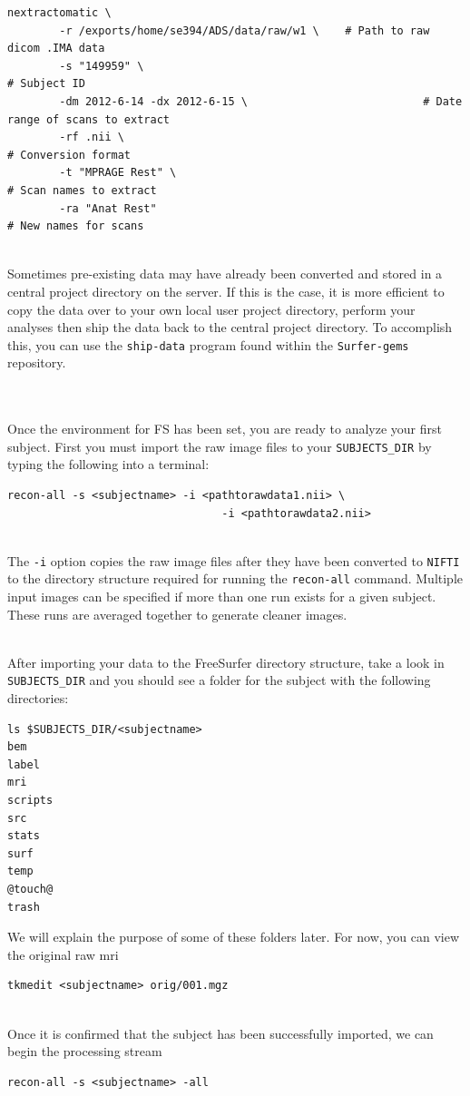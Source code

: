 \documentclass[paper=a4, fontsize=11pt]{scrartcl} %
\numberwithin{equation}{section} %
\numberwithin{figure}{section} %
\numberwithin{table}{section} %
\begin{document}
\begin{lstlisting}
nextractomatic \
		-r /exports/home/se394/ADS/data/raw/w1 \	# Path to raw dicom .IMA data
		-s "149959" \															# Subject ID
		-dm 2012-6-14 -dx 2012-6-15 \							# Date range of scans to extract
		-rf .nii \																# Conversion format
		-t "MPRAGE Rest" \ 												# Scan names to extract
		-ra "Anat Rest"													# New names for scans
\end{lstlisting}

~\\Sometimes pre-existing data may have already been converted and stored in a central project directory on the server.  If this is the case, it is more efficient to copy the data over to your own local user project directory, perform your analyses then ship the data back to the central project directory.  To accomplish this, you can use the \texttt{ship-data} program found within the \texttt{Surfer-gems} repository.

~\\ \\ Once the environment for FS has been set, you are ready to analyze your first subject.  First you must import the raw image files to your \texttt{SUBJECTS\_DIR} by typing the following into a terminal:
\begin{lstlisting}[frame=single, xrightmargin=0cm]
recon-all -s <subjectname> -i <pathtorawdata1.nii> \
			                     -i <pathtorawdata2.nii>
\end{lstlisting}

~\\The \texttt{-i} option copies the raw image files after they have been converted to \texttt{NIFTI} to the directory structure required for running the \texttt{recon-all} command.  Multiple input images can be specified if more than one run exists for a given subject.  These runs are averaged together to generate cleaner images.

~\\After importing your data to the FreeSurfer directory structure, take a look in \texttt{SUBJECTS\_DIR} and you should see a folder for the subject with the following directories:
\begin{lstlisting}[frame=single]
ls $SUBJECTS_DIR/<subjectname>
bem
label
mri
scripts
src
stats
surf
temp
@touch@
trash
\end{lstlisting}
We will explain the purpose of some of these folders later.  For now, you can view the original raw mri
\begin{lstlisting}[frame=single]
tkmedit <subjectname> orig/001.mgz
\end{lstlisting}
~\\
Once it is confirmed that the subject has been successfully imported, we can begin the processing stream
\begin{lstlisting}[frame=single]
recon-all -s <subjectname> -all
\end{lstlisting}
\end{document}
